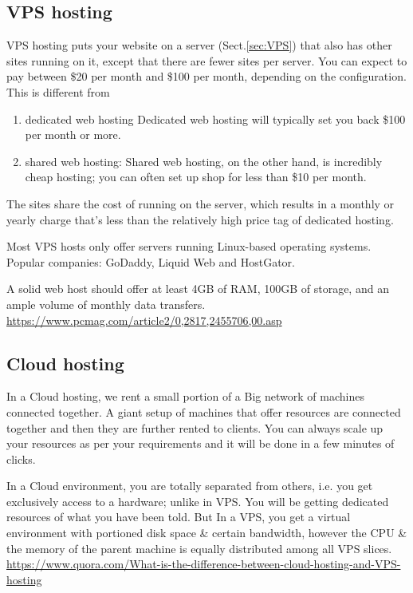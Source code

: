 \subsection{VPS hosting}
\label{sec:VPS-web-hosting}

VPS hosting puts your website on a server (Sect.\ref{sec:VPS}) that also has
other sites running on it, except that there are fewer sites per server.
You can expect to pay between \$20 per month and \$100 per month, depending on
the configuration. This is different from
\begin{enumerate}
  \item dedicated web hosting
  Dedicated web hosting will typically set you back \$100 per month or more.
  
  \item shared web hosting:
  Shared web hosting, on the other hand, is incredibly cheap hosting; you can
  often set up shop for less than \$10 per month.
  
  
\end{enumerate}

The sites share the cost of running on the server, which results in a monthly or
yearly charge that's less than the relatively high price tag of dedicated hosting.

Most VPS hosts only offer servers running Linux-based operating systems.
Popular companies: GoDaddy, Liquid Web and HostGator.

A solid web host should offer at least 4GB of RAM, 100GB of storage, and an
ample volume of monthly data transfers.
\url{https://www.pcmag.com/article2/0,2817,2455706,00.asp}




\subsection{Cloud hosting}
\label{sec:Cloud-hosting}


In a Cloud hosting, we rent a small portion of a Big network of machines
connected together. A giant setup of machines that offer resources are connected
together and then they are further rented to clients.
You can always scale up your resources as per your requirements and it will be
done in a few minutes of clicks.

In a Cloud environment, you are totally separated from others, i.e. you get
exclusively access to a hardware; unlike in VPS.
You will be getting dedicated resources of what you have been told. But In a
VPS, you get a virtual environment with portioned disk space \& certain
bandwidth, however the CPU \& the memory of the parent machine is equally
distributed among all VPS slices.
\url{https://www.quora.com/What-is-the-difference-between-cloud-hosting-and-VPS-hosting}



